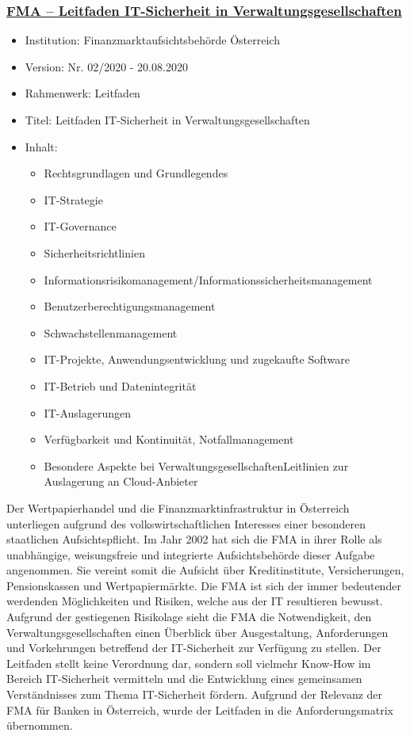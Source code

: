 
\subsubsection{\underline{FMA – Leitfaden IT-Sicherheit in Verwaltungsgesellschaften}}
\begin{itemize}
    \item Institution: Finanzmarktaufsichtsbehörde Österreich
    \item Version: Nr. 02/2020 - 20.08.2020
    \item Rahmenwerk: Leitfaden
    \item Titel: Leitfaden IT-Sicherheit in Verwaltungsgesellschaften \autocite{FMA_Leitfaden_IT_Sicherheit} 
    \item Inhalt:
        \begin{itemize}
        \item Rechtsgrundlagen und Grundlegendes 
        \item IT-Strategie 
        \item IT-Governance 
        \item Sicherheitsrichtlinien 
        \item Informationsrisikomanagement/Informationssicherheitsmanagement 
        \item Benutzerberechtigungsmanagement 
        \item Schwachstellenmanagement 
        \item IT-Projekte, Anwendungsentwicklung und zugekaufte Software 
        \item IT-Betrieb und Datenintegrität 
        \item IT-Auslagerungen 
        \item Verfügbarkeit und Kontinuität, Notfallmanagement 
        \item Besondere Aspekte bei VerwaltungsgesellschaftenLeitlinien zur Auslagerung an Cloud-Anbieter 
    \end{itemize}
\end{itemize}
\bigbreak
Der Wertpapierhandel und die Finanzmarktinfrastruktur in Österreich unterliegen aufgrund des volkswirtschaftlichen Interesses einer besonderen staatlichen Aufsichtspflicht. Im Jahr 2002 hat sich die FMA in ihrer Rolle als unabhängige, weisungsfreie und integrierte Aufsichtsbehörde dieser Aufgabe angenommen. Sie vereint somit die Aufsicht über Kreditinstitute, Versicherungen, Pensionskassen und Wertpapiermärkte. Die FMA ist sich der immer bedeutender werdenden Möglichkeiten und Risiken, welche aus der IT resultieren bewusst. Aufgrund der gestiegenen Risikolage sieht die FMA die Notwendigkeit, den Verwaltungsgesellschaften einen Überblick über Ausgestaltung, Anforderungen und Vorkehrungen betreffend der IT-Sicherheit zur Verfügung zu stellen. Der Leitfaden stellt keine Verordnung dar, sondern soll vielmehr Know-How im Bereich IT-Sicherheit vermitteln und die Entwicklung eines gemeinsamen Verständnisses zum Thema IT-Sicherheit fördern. Aufgrund der Relevanz der FMA für Banken in Österreich, wurde der Leitfaden in die Anforderungsmatrix übernommen. \autocite{FMA}

